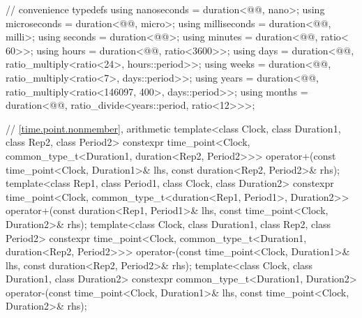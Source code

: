 \begin{codeblock}
{{    // convenience typedefs
    using nanoseconds  = duration<@@, nano>;
    using microseconds = duration<@@, micro>;
    using milliseconds = duration<@@, milli>;
    using seconds      = duration<@@>;
    using minutes      = duration<@@, ratio<  60>>;
    using hours        = duration<@@, ratio<3600>>;
    using days         = duration<@@,
                                  ratio_multiply<ratio<24>, hours::period>>;
    using weeks        = duration<@@,
                                  ratio_multiply<ratio<7>, days::period>>;
    using years        = duration<@@,
                                  ratio_multiply<ratio<146097, 400>, days::period>>;
    using months       = duration<@@,
                                  ratio_divide<years::period, ratio<12>>>;

    // \ref{time.point.nonmember},  arithmetic
    template<class Clock, class Duration1, class Rep2, class Period2>
      constexpr time_point<Clock, common_type_t<Duration1, duration<Rep2, Period2>>>
        operator+(const time_point<Clock, Duration1>& lhs, const duration<Rep2, Period2>& rhs);
    template<class Rep1, class Period1, class Clock, class Duration2>
      constexpr time_point<Clock, common_type_t<duration<Rep1, Period1>, Duration2>>
        operator+(const duration<Rep1, Period1>& lhs, const time_point<Clock, Duration2>& rhs);
    template<class Clock, class Duration1, class Rep2, class Period2>
      constexpr time_point<Clock, common_type_t<Duration1, duration<Rep2, Period2>>>
        operator-(const time_point<Clock, Duration1>& lhs, const duration<Rep2, Period2>& rhs);
    template<class Clock, class Duration1, class Duration2>
      constexpr common_type_t<Duration1, Duration2>
        operator-(const time_point<Clock, Duration1>& lhs,
                  const time_point<Clock, Duration2>& rhs);

}}
\end{codeblock}
